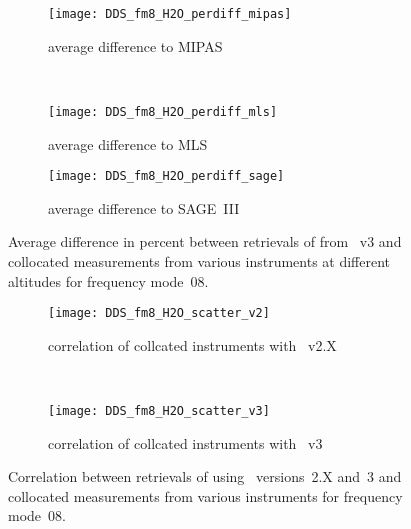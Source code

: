 \begin{figure}[htpb]
    \centering
    \begin{subfigure}[b]{0.49\textwidth}
        \texttt{[image: DDS\_fm8\_H2O\_perdiff\_mipas]}
        \caption{average difference to MIPAS}
        \label{fig:fm08:H2O:profiles:MIPAS}
    \end{subfigure}
    \,
    \begin{subfigure}[b]{0.49\textwidth}
        \texttt{[image: DDS\_fm8\_H2O\_perdiff\_mls]}
        \caption{average difference to MLS}
        \label{fig:fm08:H2O:profiles:MLS}
    \end{subfigure}

    \begin{subfigure}[b]{0.49\textwidth}
        \texttt{[image: DDS\_fm8\_H2O\_perdiff\_sage]}
        \caption{average difference to SAGE~III}
        \label{fig:fm08:H2O:profiles:SAGEIII}
    \end{subfigure}
    \caption{Average difference in percent between retrievals of 
    from \smr~v3 and collocated measurements from various instruments at
    different altitudes for frequency mode~08.}

    \label{fig:fm08:H2O:profiles}
\end{figure}

\begin{figure}[htpb]
    \centering
    \begin{subfigure}[b]{0.49\textwidth}
        \texttt{[image: DDS\_fm8\_H2O\_scatter\_v2]}
        \caption{correlation of collcated instruments with \smr~v2.X}
        \label{fig:fm08:H2O:scatter:v2}
    \end{subfigure}
    \,
    \begin{subfigure}[b]{0.49\textwidth}
        \texttt{[image: DDS\_fm8\_H2O\_scatter\_v3]}
        \caption{correlation of collcated instruments with \smr~v3}
        \label{fig:fm08:H2O:scatter:v3}
    \end{subfigure}
    \caption{Correlation between retrievals of  using \smr\
    versions~2.X and~3 and collocated measurements from various instruments
    for frequency mode~08.}
    \label{fig:fm08:H2O:scatter}
\end{figure}

